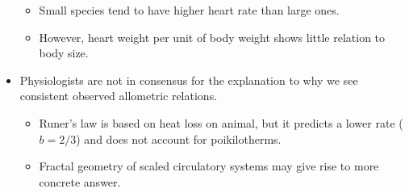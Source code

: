 \documentclass[12pt,a4paper]{article}
\begin{document}
\begin{itemize}
\begin{itemize}
            \item Small species tend to have higher heart rate than large ones.
            \item However, heart weight per unit of body weight shows little relation to body size.
        \end{itemize}
    \item Physiologists are not in consensus for the explanation to why we see consistent observed allometric relations.
        \begin{itemize}
            \item Runer's law is based on heat loss on animal, but it predicts a lower rate (\(b={2/3}\)) and does not account for poikilotherms.
            \item Fractal geometry of scaled circulatory systems may give rise to more concrete answer.
        \end{itemize}
\end{itemize}





\clearpage
{}

\end{document}
